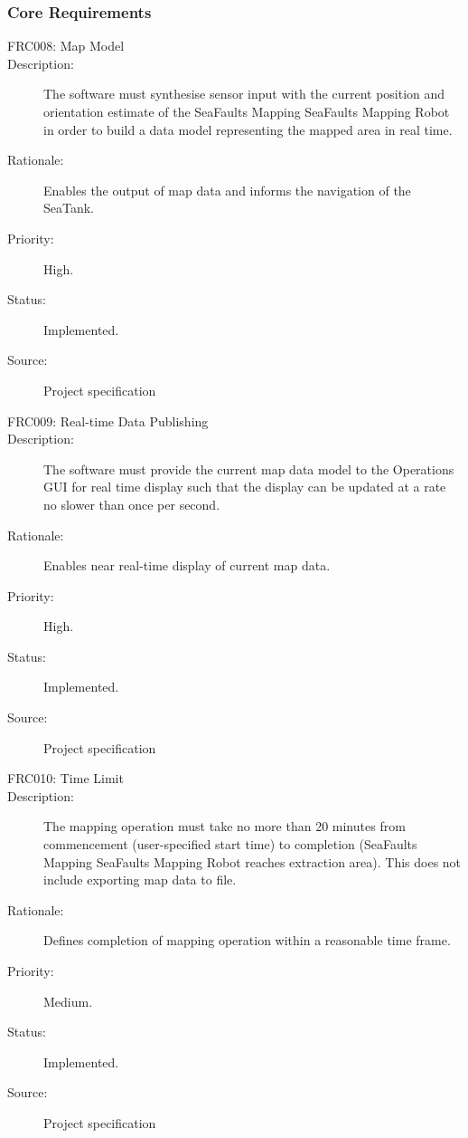 \documentclass[12pt]{article}
\begin{document}
\subsubsection{Core Requirements}
\begin{description}
\item [{FRC008: Map Model}\label{FRC008}] 
\item [{Description: }\label{Description}] The software must synthesise sensor input with the current position and orientation estimate of the SeaFaults Mapping SeaFaults Mapping Robot in order to build a data model representing the mapped area in real time.
\item[{Rationale: }\label{Rationale}] Enables the output of map data and informs the navigation of the SeaTank.
\item[{Priority: }\label{Priority}] High.
\item[{Status: }\label{Status}] Implemented.
\item[{Source: }\label{Source}] Project specification \cite{spec}

\item [{FRC009: Real-time Data Publishing}\label{FRC009}] 
\item [{Description: }\label{Description}] The software must provide the current map data model to the Operations GUI for real time display such that the display can be updated at a rate no slower than once per second.
\item[{Rationale: }\label{Rationale}] Enables near real-time display of current map data.
\item[{Priority: }\label{Priority}] High.
\item[{Status: }\label{Status}] Implemented.
\item[{Source: }\label{Source}] Project specification \cite{spec}

\item [{FRC010: Time Limit}\label{FRC010}] 
\item [{Description: }\label{Description}] The mapping operation must take no more than 20 minutes from commencement (user-specified start time) to completion (SeaFaults Mapping SeaFaults Mapping Robot reaches extraction area). This does not include exporting map data to file. 
\item[{Rationale: }\label{Rationale}] Defines completion of mapping operation within a reasonable time frame.
\item[{Priority: }\label{Priority}] Medium.
\item[{Status: }\label{Status}] Implemented.
\item[{Source: }\label{Source}] Project specification \cite{spec}


\end{description}
\end{document}
